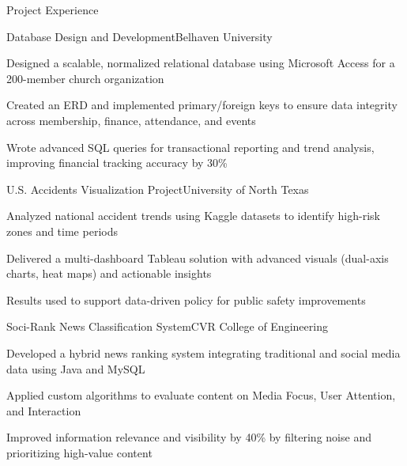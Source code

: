 \documentclass{resume}
\begin{document}

\begin{rSection}{Project Experience}

\begin{rSubsection}{Database Design and Development}{}{Belhaven University}{}
\item Designed a scalable, normalized relational database using Microsoft Access for a 200-member church organization
\item Created an ERD and implemented primary/foreign keys to ensure data integrity across membership, finance, attendance, and events
\item Wrote advanced SQL queries for transactional reporting and trend analysis, improving financial tracking accuracy by 30\%
\end{rSubsection}

\begin{rSubsection}{U.S. Accidents Visualization Project}{}{University of North Texas}{}
\item Analyzed national accident trends using Kaggle datasets to identify high-risk zones and time periods
\item Delivered a multi-dashboard Tableau solution with advanced visuals (dual-axis charts, heat maps) and actionable insights
\item Results used to support data-driven policy for public safety improvements
\end{rSubsection}

\begin{rSubsection}{Soci-Rank News Classification System}{}{CVR College of Engineering}{}
\item Developed a hybrid news ranking system integrating traditional and social media data using Java and MySQL
\item Applied custom algorithms to evaluate content on Media Focus, User Attention, and Interaction
\item Improved information relevance and visibility by 40\% by filtering noise and prioritizing high-value content
\end{rSubsection}

\end{rSection}

\end{document}
